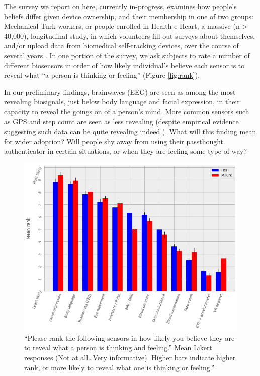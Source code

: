 \documentclass[sigconf]{acmart}
\begin{document}
The survey we report on here, currently in-progress, examines how people's beliefs differ given device ownership, and their membership in one of two groups: Mechanical Turk workers, or people enrolled in Health-e-Heart, a massive (n > 40,000), longitudinal study, in which volunteers fill out surveys about themselves, and/or upload data from biomedical self-tracking devices, over the course of several years \cite{Estrin2010a}.
In one portion of the survey, we ask subjects to rate a number of different biosensors in order of how likely individual's believe each sensor is to reveal what ``a person is thinking or feeling'' (Figure \ref{fig:rank}).

In our preliminary findings, brainwaves (EEG) are seen as among the most revealing biosignals, just below body language and facial expression, in their capacity to reveal the goings on of a person's mind. 
More common sensors such as GPS and step count are seen as less revealing (despite empirical evidence suggesting such data can be quite revealing indeed \cite{Canzian2015}).
What will this finding mean for wider adoption? 
Will people shy away from using their passthought authenticator in certain situations, or when they are feeling some type of way?


\label{fig:rank}
\begin{figure}
\centering
\includegraphics[width=.9\linewidth]{./figures/rankings.png}
\caption{``Please rank the following sensors in how likely you believe they are to reveal what a person is thinking and feeling.'' Mean Likert responses (Not at all\ldots{}Very informative). Higher bars indicate higher rank, or more likely to reveal what one is thinking or feeling.''}
\end{figure}
\end{document}
